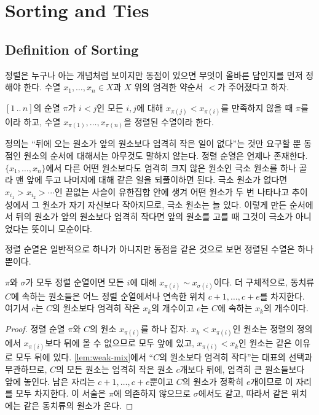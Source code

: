 \section{Sorting and Ties}
\label{sec:sorting}

\subsection{Definition of Sorting}

정렬은 누구나 아는 개념처럼 보이지만 동점이 있으면 무엇이 올바른 답인지를 먼저 정해야 한다. 수열 $x_1,\dots,x_n\in X$과 $X$ 위의 엄격한 약순서 $<$가 주어졌다고 하자.

\begin{definition}[정렬]
\label{def:sorting}
$[1\,..\,n]$의 순열 $\pi$가 $i<j$인 모든 $i,j$에 대해 $x_{\pi(j)}<x_{\pi(i)}$를 만족하지 않을 때 $\pi$를 이라 하고, 수열 $x_{\pi(1)},\dots,x_{\pi(n)}$을 정렬된 수열이라 한다.
\end{definition}

정의는 ``뒤에 오는 원소가 앞의 원소보다 엄격히 작은 일이 없다''는 것만 요구할 뿐 동점인 원소의 순서에 대해서는 아무것도 말하지 않는다. 정렬 순열은 언제나 존재한다. $\{x_1,\dots,x_n\}$에서 다른 어떤 원소보다도 엄격히 크지 않은 원소인 극소 원소를 하나 골라 맨 앞에 두고 나머지에 대해 같은 일을 되풀이하면 된다. 극소 원소가 없다면 $x_{i_1}>x_{i_2}>\cdots$인 끝없는 사슬이 유한집합 안에 생겨 어떤 원소가 두 번 나타나고 추이성에서 그 원소가 자기 자신보다 작아지므로, 극소 원소는 늘 있다. 이렇게 만든 순서에서 뒤의 원소가 앞의 원소보다 엄격히 작다면 앞의 원소를 고를 때 그것이 극소가 아니었다는 뜻이니 모순이다.

정렬 순열은 일반적으로 하나가 아니지만 동점을 같은 것으로 보면 정렬된 수열은 하나뿐이다.

\begin{proposition}
\label{prop:sorted-unique}
$\pi$와 $\sigma$가 모두 정렬 순열이면 모든 $i$에 대해 $x_{\pi(i)}\sim x_{\sigma(i)}$이다. 더 구체적으로, 동치류 $C$에 속하는 원소들은 어느 정렬 순열에서나 연속한 위치 $c+1,\dots,c+e$를 차지한다. 여기서 $c$는 $C$의 원소보다 엄격히 작은 $x_k$의 개수이고 $e$는 $C$에 속하는 $x_k$의 개수이다.
\end{proposition}

\begin{proof}
정렬 순열 $\pi$와 $C$의 원소 $x_{\pi(i)}$를 하나 잡자. $x_k<x_{\pi(i)}$인 원소는 정렬의 정의에서 $x_{\pi(i)}$보다 뒤에 올 수 없으므로 모두 앞에 있고, $x_{\pi(i)}<x_k$인 원소는 같은 이유로 모두 뒤에 있다. \cref{lem:weak-mix}에서 ``$C$의 원소보다 엄격히 작다''는 대표의 선택과 무관하므로, $C$의 모든 원소는 엄격히 작은 원소 $c$개보다 뒤에, 엄격히 큰 원소들보다 앞에 놓인다. 남은 자리는 $c+1,\dots,c+e$뿐이고 $C$의 원소가 정확히 $e$개이므로 이 자리를 모두 차지한다. 이 서술은 $\pi$에 의존하지 않으므로 $\sigma$에서도 같고, 따라서 같은 위치에는 같은 동치류의 원소가 온다.
\end{proof}

